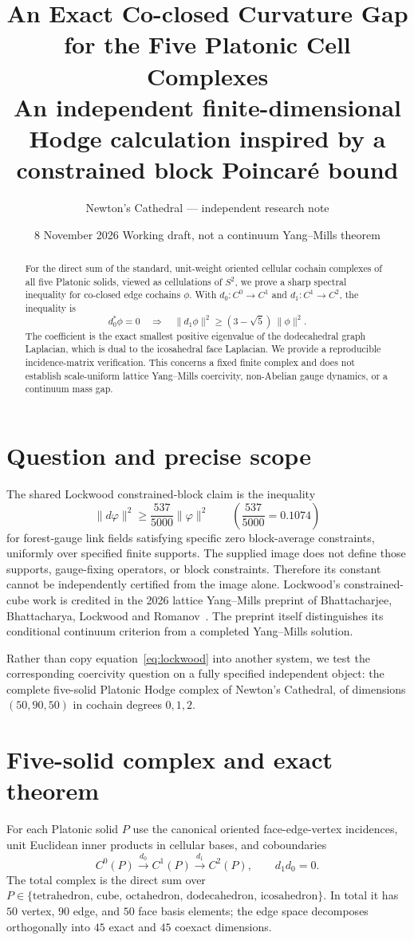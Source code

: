 \documentclass[11pt,a4paper]{article}
\title{\vspace{-1.1cm}\textbf{An Exact Co-closed Curvature Gap\\for the Five Platonic Cell Complexes}\\[5pt]\large An independent finite-dimensional Hodge calculation inspired by a constrained block Poincar\'e bound}
\author{Newton's Cathedral --- independent research note}
\date{8 November 2026 \;\textbullet\; Working draft, not a continuum Yang--Mills theorem}
\begin{document}
\maketitle
\vspace{-7mm}
\begin{abstract}
For the direct sum of the standard, unit-weight oriented cellular cochain complexes of all five Platonic solids, viewed as cellulations of $S^2$, we prove a sharp spectral inequality for co-closed edge cochains $\phi$. With $d_0:C^0\to C^1$ and $d_1:C^1\to C^2$, the inequality is
\[
\boxed{\quad d_0^{\!*}\phi=0\quad\Longrightarrow\quad
\|d_1\phi\|^2\ge (3-\sqrt 5)\,\|\phi\|^2.\quad}
\]
The coefficient is the exact smallest positive eigenvalue of the dodecahedral graph Laplacian, which is dual to the icosahedral face Laplacian. We provide a reproducible incidence-matrix verification. This concerns a fixed finite complex and does not establish scale-uniform lattice Yang--Mills coercivity, non-Abelian gauge dynamics, or a continuum mass gap.
\end{abstract}

\section{Question and precise scope}
The shared Lockwood constrained-block claim is the inequality
\begin{equation}\label{eq:lockwood}
 \|d\varphi\|^2\ge \frac{537}{5000}\|\varphi\|^2
 \qquad\left(\frac{537}{5000}=0.1074\right)
\end{equation}
for forest-gauge link fields satisfying specific zero block-average constraints, uniformly over specified finite supports. The supplied image does not define those supports, gauge-fixing operators, or block constraints. Therefore its constant cannot be independently certified from the image alone. Lockwood's constrained-cube work is credited in the 2026 lattice Yang--Mills preprint of Bhattacharjee, Bhattacharya, Lockwood and Romanov~\cite{bhattacharjee2026}. The preprint itself distinguishes its conditional continuum criterion from a completed Yang--Mills solution.

Rather than copy equation~\eqref{eq:lockwood} into another system, we test the corresponding coercivity question on a fully specified independent object: the complete five-solid Platonic Hodge complex of Newton's Cathedral, of dimensions $(50,90,50)$ in cochain degrees $0,1,2$.

\section{Five-solid complex and exact theorem}
For each Platonic solid $P$ use the canonical oriented face-edge-vertex incidences, unit Euclidean inner products in cellular bases, and coboundaries
\[
 C^0(P)\xrightarrow{d_0}C^1(P)\xrightarrow{d_1}C^2(P),
 \qquad d_1d_0=0.
\]
The total complex is the direct sum over $P\in\{\text{tetrahedron, cube, octahedron, dodecahedron, icosahedron}\}$. In total it has $50$ vertex, $90$ edge, and $50$ face basis elements; the edge space decomposes orthogonally into $45$ exact and $45$ coexact dimensions.
\end{document}
